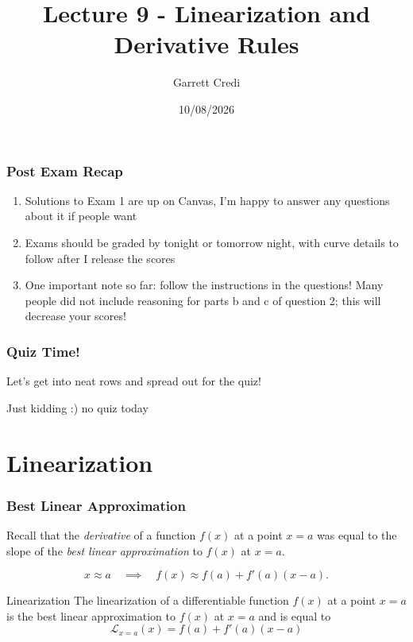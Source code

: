 \documentclass{ltx-talk}
\title{Lecture 9 - Linearization and Derivative Rules}
\author{Garrett Credi}
\date{10/08/2026}
\begin{document}
\begin{frame}
  \maketitle
\end{frame}

\begin{frame}
  \frametitle{Post Exam Recap} 

  \begin{enumerate}
    \item Solutions to Exam 1 are up on Canvas, I'm happy to answer any questions about it if people want
    \item Exams should be graded by tonight or tomorrow night, with curve details to follow after I release the scores
    \item One important note so far: follow the instructions in the questions! Many people did not include reasoning for parts b and c of question 2; this will decrease your scores!
  \end{enumerate}
\end{frame}

\begin{frame}
  \frametitle{Quiz Time!}

  Let's get into neat rows and spread out for the quiz! \pause

  Just kidding :) no quiz today
\end{frame}

\section{Linearization}

\begin{frame}
  \frametitle{Best Linear Approximation}

  Recall that the \textit{derivative} of a function $f(x)$
  at a point $x = a$
  was equal to the slope of the \textit{best linear approximation}
  to $f(x)$ at $x = a$. \pause

  \begin{equation}
    x \approx a \quad \implies \quad f(x) \approx f(a) + f'(a)(x - a).
  \end{equation} \pause

  \begin{block}{Linearization}
    The linearization of a differentiable function $f(x)$ at a point $x = a$
    is the best linear approximation to $f(x)$ at $x = a$ and is equal to \pause
    \begin{equation}
      \mathscr{L}_{x = a}(x) = f(a) + f'(a)(x - a)
    \end{equation}
  \end{block}
\end{frame}
\end{document}
